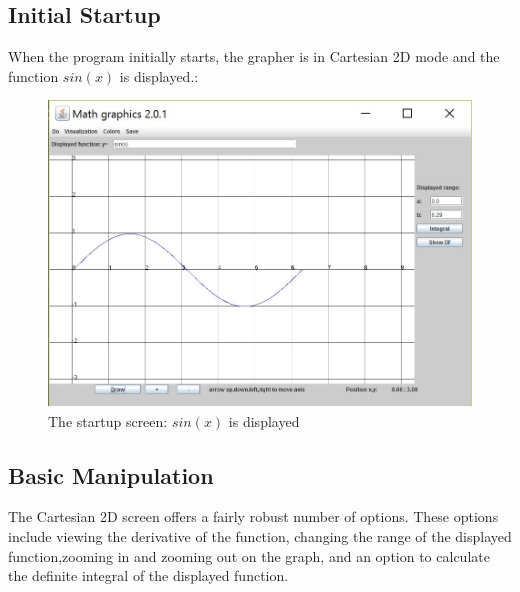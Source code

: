 \documentclass{article}[12 pt]
\begin{document}
		\subsection{Initial Startup}
		When the program initially starts, the grapher is in Cartesian 2D mode and the function $sin(x)$ is displayed.:
			\begin{figure}[h!]
 				\centering
 				\includegraphics[scale = .75]{startupScreen}
 				\caption{The startup screen: $sin(x)$ is displayed}
 			\end{figure}
 		
 		\subsection{Basic Manipulation}
 		The Cartesian 2D screen offers a fairly robust number of options. These options include viewing the derivative of the function, changing the range of the displayed function,zooming in and zooming out on the graph, and an option to calculate the definite integral of the displayed function.  
 		
\end{document}
